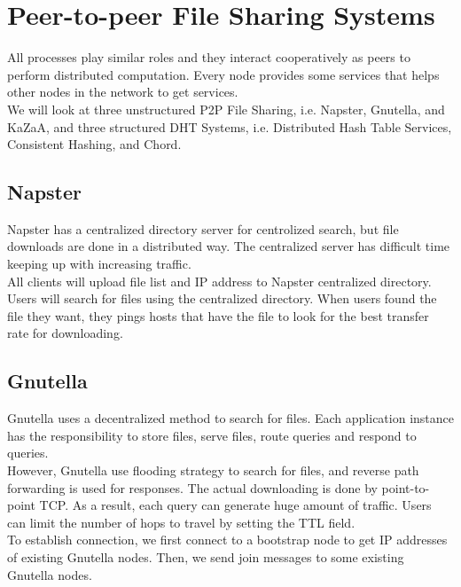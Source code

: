 \chapter{Peer-to-peer File Sharing Systems}
\begin{multicols*}{2}

\noindent All processes play similar roles and they interact cooperatively as peers to perform distributed computation. Every node provides some services that helps other nodes in the network to get services. \\

\noindent We will look at three unstructured P2P File Sharing, i.e. Napster, Gnutella, and KaZaA, and three structured DHT Systems, i.e. Distributed Hash Table Services, Consistent Hashing, and Chord. 

\section{Napster}

\noindent Napster has a centralized directory server for centrolized search, but file downloads are done in a distributed way. The centralized server has difficult time keeping up with increasing traffic.\\

\noindent All clients will upload file list and IP address to Napster centralized directory. Users will search for files using the centralized directory. When users found the file they want, they pings hosts that have the file to look for the best transfer rate for downloading. 

\section{Gnutella}

\noindent Gnutella uses a decentralized method to search for files. Each application instance has the responsibility to store files, serve files, route queries and respond to queries. \\

\noindent However, Gnutella use flooding strategy to search for files, and reverse path forwarding is used for responses. The actual downloading is done by point-to-point TCP. As a result, each query can generate huge amount of traffic. Users can limit the number of hops to travel by setting the TTL field.\\

\noindent To establish connection, we first connect to a bootstrap node to get IP addresses of existing Gnutella nodes. Then, we send join messages to some existing Gnutella nodes. 


\end{multicols*}
